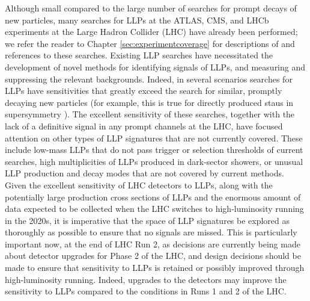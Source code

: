 Although small compared to the large number of searches for prompt decays of new particles, many searches for LLPs at the ATLAS, CMS, and LHCb experiments at the Large Hadron Collider (LHC) have already been performed; we refer the reader to Chapter \ref{sec:experimentcoverage} for descriptions of and references to these searches. Existing LLP searches have necessitated the development of novel methods for identifying signals of LLPs, and measuring and suppressing the relevant backgrounds.
Indeed, in several scenarios searches for LLPs have sensitivities that greatly exceed the search for similar, promptly decaying new particles (for example, this is true for directly produced staus in supersymmetry \cite{CMS-PAS-EXO-16-036}).
The excellent sensitivity of these searches, together with the lack of a definitive signal in any prompt channels at the LHC, have focused attention on other types of LLP signatures that are not currently covered.
These include low-mass LLPs that do not pass trigger or selection thresholds of current searches, high multiplicities of LLPs produced in dark-sector showers, or unusual LLP production and decay modes that are not covered by current methods.
Given the excellent  sensitivity of LHC detectors to LLPs, along with the potentially large production cross sections of LLPs and the enormous amount of data expected to be collected when the LHC switches to high-luminosity running in the 2020s, it is imperative that the space of LLP signatures be explored as thoroughly as possible to ensure that no signals are missed.
This is particularly important now, at the end of LHC Run 2, as decisions are currently being made about detector upgrades for Phase 2 of the LHC, and design decisions should be made to ensure that sensitivity to LLPs is retained or possibly improved through high-luminosity running.
Indeed, upgrades to the detectors may improve the sensitivity to LLPs compared to the conditions in Runs 1 and 2 of the LHC.

